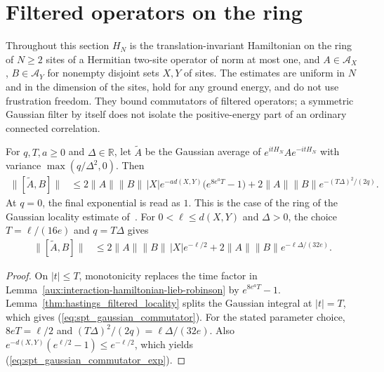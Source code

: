 \section{Filtered operators on the ring}
\label{sec:ring_dynamics_filters}

Throughout this section $H_N$ is the translation-invariant Hamiltonian on the
ring of $N\ge2$ sites of a Hermitian two-site operator of norm at most one, and
$A\in\mathcal A_X$, $B\in\mathcal A_Y$ for nonempty disjoint sets $X,Y$ of sites.
The estimates are uniform in $N$ and in the dimension of the sites, hold for any
ground energy, and do not use frustration freedom. They bound commutators of
filtered operators; a symmetric Gaussian filter by itself does not isolate the
positive-energy part of an ordinary connected correlation.

\begin{lemma}
    \label{lem:spt_finite_ring_gaussian_commutator}
    \leanok
    For $q,T,a\geq0$ and $\Delta\in\mathbb R$, let
    $\widetilde A$ be the Gaussian average of $e^{itH_N}Ae^{-itH_N}$ with
    variance $\max(q/\Delta^2,0)$. Then
    \begin{align}
        \|[\widetilde A,B]\|
         & \leq 2\|A\|\|B\|\,|X|e^{-a d(X,Y)}
        \bigl(e^{8e^aT}-1\bigr)
        +2\|A\|\|B\|e^{-(T\Delta)^2/(2q)}.
        \label{eq:spt_gaussian_commutator}
    \end{align}
    At $q=0$, the final exponential is read as $1$.
    This is the case of the ring of the Gaussian locality estimate
    of~\cite[equation \texttt{lbnd}]{Hastings2006Solving}.
    For $0<\ell\leq d(X,Y)$ and $\Delta>0$, the choice
    $T=\ell/(16e)$ and $q=T\Delta$ gives
    \begin{align}
        \|[\widetilde A,B]\|
         & \leq 2\|A\|\|B\|\,|X|e^{-\ell/2}
        +2\|A\|\|B\|e^{-\ell\Delta/(32e)}.
        \label{eq:spt_gaussian_commutator_exp}
    \end{align}
\end{lemma}
\begin{proof}\leanok
    On $|t|\leq T$, monotonicity replaces the time factor in
    Lemma~\ref{aux:interaction-hamiltonian-lieb-robinson} by $e^{8e^aT}-1$. Lemma~\ref{thm:hastings_filtered_locality}
    splits the Gaussian integral at $|t|=T$, which gives
    (\ref{eq:spt_gaussian_commutator}).
    For the stated parameter choice, $8eT=\ell/2$ and
    $(T\Delta)^2/(2q)=\ell\Delta/(32e)$. Also
    $e^{-d(X,Y)}(e^{\ell/2}-1)\leq e^{-\ell/2}$, which yields
    (\ref{eq:spt_gaussian_commutator_exp}).
\end{proof}

